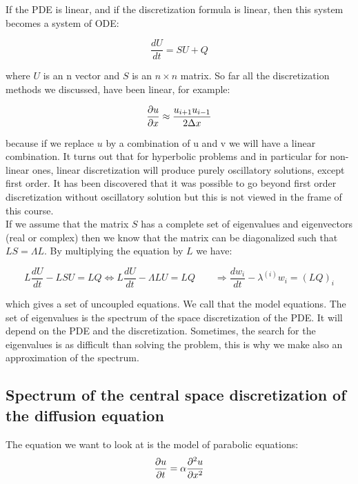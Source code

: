 If the PDE is linear, and if the discretization formula is linear, then this system becomes a system of ODE: 

\begin{equation}
\frac{d U}{dt} = SU + Q
\end{equation}

where $U$ is an n vector and $S$ is an $n\times n$ matrix. So far all the discretization methods we discussed, have been linear, for example: 

\begin{equation}
\frac{\partial u}{\partial x} \approx \frac{u_{i+1}u_{i-1}}{2\Delta x}
\end{equation}

because if we replace $u$ by a combination of u and v we will have a linear combination. It turns out that for hyperbolic problems and in particular for non-linear ones, linear discretization will produce purely oscillatory solutions, except first order. It has been discovered that it was possible to go beyond first order discretization without oscillatory solution but this is not viewed in the frame of this course. \\

If we assume that the matrix $S$ has a complete set of eigenvalues and eigenvectors (real or complex) then we know that the matrix can be diagonalized such that $LS = \Lambda L$. By multiplying the equation by $L$ we have: 

\begin{equation}
L\frac{dU}{dt} - LSU = LQ \Leftrightarrow L\frac{dU}{dt} - \Lambda LU = LQ \qquad \Rightarrow \frac{dw_i}{dt} - \lambda ^{(i)}w_i = (LQ )_i 
\end{equation}

which gives a set of uncoupled equations. We call that the model equations. The set of eigenvalues is the spectrum of the space discretization of the PDE. It will depend on the PDE and the discretization. Sometimes, the search for the eigenvalues is as difficult than solving the problem, this is why we make also an approximation of the spectrum. 

\subsection{Spectrum of the central space discretization of the diffusion equation}
The equation we want to look at is the model of parabolic equations:
\begin{equation}
\frac{\partial u}{\partial t} = \alpha \frac{\partial ^2 u}{\partial x^2}
\end{equation}


